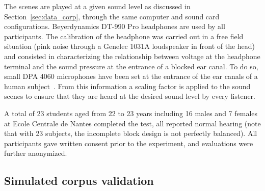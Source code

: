\documentclass[twocolumn]{article}
\begin{document}
The scenes are played at a given sound level as discussed in Section~\ref{sec:data_corp}, through the same computer and sound card configurations. Beyerdynamics DT-990 Pro headphones are used by all participants. The calibration of the headphone was carried out in a free field situation (pink noise through a Genelec 1031A loudspeaker in front of the head) and consisted in characterizing the relationship between voltage at the headphone terminal and the sound pressure at the entrance of a blocked ear canal. To do so, small DPA 4060 microphones have been set at the entrance of the ear canals of a human subject~\cite{moller1992}. From this information a scaling factor is applied to the sound scenes to ensure that they are heard at the desired sound level by every listener.

A total of 23 students aged from 22 to 23 years including 16 males and 7 females at Ecole Centrale de Nantes completed the test, all reported normal hearing (note that with 23 subjects, the incomplete block design is not perfectly balanced). All participants gave written consent prior to the experiment, and evaluations were further anonymized.


\subsection{Simulated corpus validation}
\label{sec:data_val}
\end{document}
